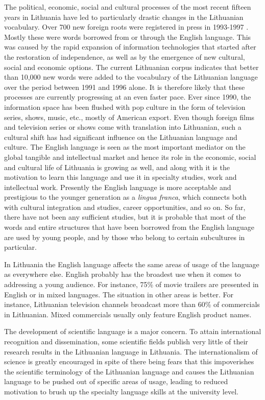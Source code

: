 \begin{multicols}{2}
The political, economic, social and cultural processes of the most recent fifteen years in Lithuania have led to particularly drastic changes in the Lithuanian vocabulary. Over 700 new foreign roots were registered in press in 1993-1997 \cite{nbi1}.  Mostly these were words borrowed from or through the English language. This was caused by the rapid expansion of information technologies that started after the restoration of independence, as well as by the emergence of new cultural, social and economic options. The current Lithuanian corpus indicates that better than 10,000 new words were added to the vocabulary of the Lithuanian language over the period between 1991 and 1996 alone. It is therefore likely that these processes are currently progressing at an even faster pace. 
Ever since 1990, the information space has been flushed with pop culture in the form of television series, shows, music, etc., mostly of American export. Even though foreign films and television series or shows come with translation into Lithuanian, such a cultural shift has had significant influence on the Lithuanian language and culture. The English language is seen as the most important mediator on the global tangible and intellectual market and hence its role in the economic, social and cultural life of Lithuania is growing as well, and along with it is the motivation to learn this language and use it in specialty studies, work and intellectual work. Presently the English language is more acceptable and prestigious to the younger generation as a \textit{lingua franca}, which connects both with cultural integration and studies, career opportunities, and so on. So far, there have not been any sufficient studies, but it is probable that most of the words and entire structures that have been borrowed from the English language are used by young people, and by those who belong to certain subcultures in particular.

In Lithuania the English language affects the same areas of usage of the language as everywhere else. English probably has the broadest use when it comes to addressing a young audience. For instance, 75\% of movie trailers are presented in English or in mixed languages. The situation in other areas is better. For instance, Lithuanian television channels broadcast more than 60\% of commercials in Lithuanian. Mixed commercials usually only feature English product names\cite{nbi1}.

The development of scientific language is a major concern. To attain international recognition and dissemination, some scientific fields publish very little of their research results in the Lithuanian language in Lithuania. The internationalism of science is greatly encouraged in spite of there being fears that this impoverishes the scientific terminology of the Lithuanian language and causes the Lithuanian language to be pushed out of specific areas of usage, leading to reduced motivation to brush up the specialty language skills at the university level.


\end{multicols}
